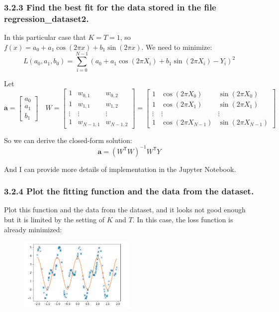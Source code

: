\documentclass{article}
\newcommand{\V}[1]{\boldsymbol{#1}}
\begin{document}
\subsubsection*{3.2.3 Find the best fit for the data stored in the file regression\_dataset2.}
In this particular case that \( K = T = 1 \), so \( f(x) = a_0 + a_1 \cos(2 \pi x) + b_1 \sin(2 \pi x) \). We need to minimize:
\[ L(a_0, a_1, b_0) = \sum_{i=0}^{N-1} {(a_0 + a_1 \cos(2 \pi X_i) + b_1 \sin(2 \pi X_i) - Y_i)}^2 \]

Let
\[
    \V{a} = 
    \begin{bmatrix}
        a_0 \\
        a_1 \\
        b_1
    \end{bmatrix}
    \quad
    W = 
    \begin{bmatrix} 
        1 & w_{0,1} & w_{0,2} \\
        1 & w_{1,1} & w_{1,2} \\
        \vdots & \vdots & \vdots \\
        1 & w_{N-1,1} & w_{N-1,2}
    \end{bmatrix}
    =
    \begin{bmatrix} 
        1 & \cos(2 \pi X_0) & \sin(2 \pi X_0) \\
        1 & \cos(2 \pi X_1) & \sin(2 \pi X_1) \\
        \vdots & \vdots & \vdots \\
        1 & \cos(2 \pi X_{N-1}) & \sin(2 \pi X_{N-1})
    \end{bmatrix}
\]

So we can derive the closed-form solution:
\[ \V{a} = {(W^\mathsf{T} W)}^{-1} W^\mathsf{T} Y \] 

And I can provide more details of implementation in the Jupyter Notebook.

\subsubsection*{3.2.4 Plot the fitting function and the data from the dataset.}
Plot this function and the data from the dataset, and it looks not good enough but it is limited by the setting of \( K \) and \( T \). In this case, the loss function is already minimized:
\begin{figure}[ht]
    \centering
    \includegraphics[width=0.5\textwidth]{imgs/3.png}
\end{figure}
\end{document}
